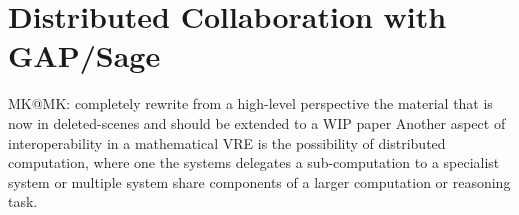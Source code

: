\section{Distributed Collaboration with GAP/Sage}\label{sec:gapsage}
\begin{newpart}{MK@MK: completely rewrite from a high-level perspective the material that is now
  in deleted-scenes and should be extended to a WIP paper}
Another aspect of interoperability in a mathematical VRE is the possibility of distributed
computation, where one the systems delegates a sub-computation to a specialist system or
multiple system share components of a larger computation or reasoning task.
\end{newpart}
